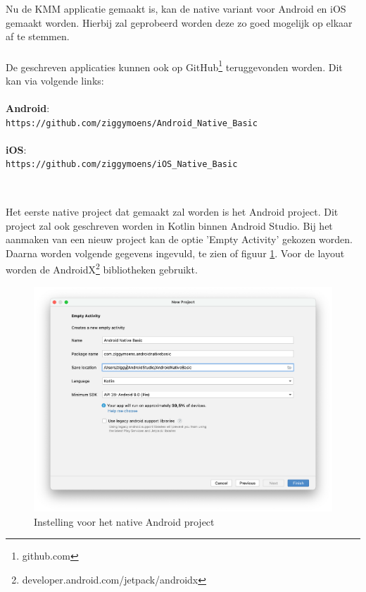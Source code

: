 \section{}
\label{sec:M-first-native}
Nu de KMM applicatie gemaakt is, kan de native variant voor Android en iOS gemaakt worden. Hierbij zal geprobeerd worden deze zo goed mogelijk op elkaar af te stemmen.
\\ \\
De geschreven applicaties kunnen ook op GitHub\footnote{github.com} teruggevonden worden. Dit kan via volgende links:
\\ \\
\textbf{Android}:
\\
\verb*|https://github.com/ziggymoens/Android_Native_Basic|
\\ \\
\textbf{iOS}:
\\
\verb*|https://github.com/ziggymoens/iOS_Native_Basic|
\\ \\

\subsection{}
\label{sec:M-first-native-android}
Het eerste native project dat gemaakt zal worden is het Android project. Dit project zal ook geschreven worden in Kotlin binnen Android Studio. Bij het aanmaken van een nieuw project kan de optie 'Empty Activity' gekozen worden. Daarna worden volgende gegevens ingevuld, te zien of figuur \ref{fig:M-basic-android-start}. Voor de layout worden de AndroidX\footnote{developer.android.com/jetpack/androidx} bibliotheken gebruikt.

 \begin{figure}
    \centering
    \includegraphics[width=14cm]{img/android-basic-start.png}
    \caption{Instelling voor het native Android project}
    \label{fig:M-basic-android-start}
\end{figure}

